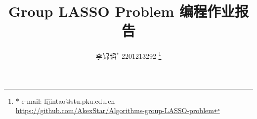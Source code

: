\documentclass[journal, a4paper]{IEEEtran}
\begin{document}
\newcommand{\figref}[1]{图\ref{#1}}
\newcommand{\tabref}[1]{表\ref{#1}}
\newcommand{\equref}[1]{式\ref{#1}}
\newcommand{\secref}[1]{第\ref{#1}节}

\title{\textbf{Group LASSO Problem 编程作业报告}}
\author{李锦韬$^*$ 2201213292
\thanks{$*$ e-mail: lijintao@stu.pku.edu.cn \\ \url{https://github.com/AkexStar/Algorithms-group-LASSO-problem}}}
\maketitle


\end{document}

